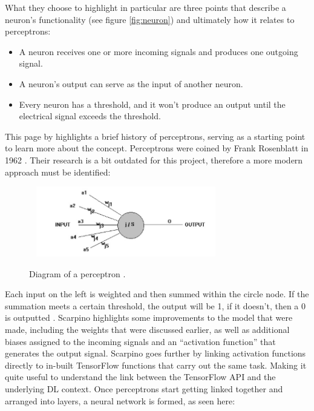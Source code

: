 \documentclass[12pt,a4paper]{report}
\begin{document}
\break

What they choose to highlight in particular are three points that describe a neuron's functionality (see figure \ref{fig:neuron})
and ultimately how 
it relates to perceptrons:

\begin{itemize}
    \item A neuron receives one or more incoming signals and produces one outgoing signal.
    \item A neuron's output can serve as the input of another neuron.
    \item Every neuron has a threshold, and it won't produce an output until the electrical signal
     exceeds the threshold.
\end{itemize}

This page by \citet{anonpercep} highlights a brief history of perceptrons,
serving as a starting point to learn more about the concept. Perceptrons were coined by Frank Rosenblatt in 1962  
\citep{rosenblatt1961principles}. Their research is a bit outdated for this project, therefore a more modern approach
must be identified:

\begin{figure}[h]\
    \centering
    \includegraphics[width=0.7\textwidth]{perceptron.jpg}
    \caption{Diagram of a perceptron \citep{anonpercep}.}
\end{figure}

Each input on the left is weighted and then summed within the circle node. If the summation meets a certain threshold, 
the output will be 1, if it doesn't, then a 0 is outputted \citep{ScarpinoMatthew2018Tfd}. 
Scarpino highlights some 
improvements to the model that were made, including the weights that were discussed earlier, as well as additional biases 
assigned to the incoming signals and an “activation function” that generates the output signal. Scarpino goes further 
by linking activation functions directly to in-built TensorFlow functions that carry out the same task. Making it 
quite useful to understand the link between the TensorFlow API and the underlying DL context. Once 
perceptrons start getting linked together and arranged into layers, a neural network is formed, as seen here:
\end{document}
